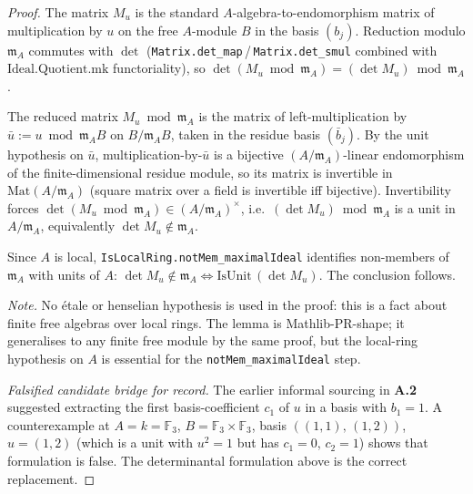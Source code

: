 \begin{proof}

\leanok
The matrix $M_u$ is the standard $A$-algebra-to-endomorphism
matrix of multiplication by $u$ on the free $A$-module $B$ in the
basis $(b_j)$. Reduction modulo $\mathfrak m_A$ commutes with
$\det$ (\texttt{Matrix.det\_map}\,/\,\texttt{Matrix.det\_smul}
combined with $\mathrm{Ideal.Quotient.mk}$ functoriality), so
$\det(M_u \bmod \mathfrak m_A) = (\det M_u) \bmod \mathfrak m_A$.

The reduced matrix $M_u \bmod \mathfrak m_A$ is the matrix of
left-multiplication by $\bar u := u \bmod \mathfrak m_A B$ on
$B / \mathfrak m_A B$, taken in the residue basis $(\bar b_j)$.
By the unit hypothesis on $\bar u$, multiplication-by-$\bar u$ is
a bijective $(A/\mathfrak m_A)$-linear endomorphism of the
finite-dimensional residue module, so its matrix is invertible
in $\mathrm{Mat}(A/\mathfrak m_A)$ (square matrix over a field is
invertible iff bijective). Invertibility forces
$\det(M_u \bmod \mathfrak m_A) \in (A/\mathfrak m_A)^\times$,
i.e.\ $(\det M_u) \bmod \mathfrak m_A$ is a unit in
$A/\mathfrak m_A$, equivalently $\det M_u \notin \mathfrak m_A$.

Since $A$ is local, \texttt{IsLocalRing.notMem\_maximalIdeal}
identifies non-members of $\mathfrak m_A$ with units of $A$:
$\det M_u \notin \mathfrak m_A \Leftrightarrow
\mathrm{IsUnit}\,(\det M_u)$. The conclusion follows.

\textit{Note.} No étale or henselian hypothesis is used in the
proof: this is a fact about finite free algebras over local rings.
The lemma is Mathlib-PR-shape; it generalises to any finite free
module by the same proof, but the local-ring hypothesis on $A$ is
essential for the \texttt{notMem\_maximalIdeal} step.

\textit{Falsified candidate bridge for record.} The earlier
informal sourcing in \textbf{A.2} suggested extracting the first
basis-coefficient $c_1$ of $u$ in a basis with $b_1 = 1$. A
counterexample at $A = k = \mathbb{F}_3$, $B = \mathbb{F}_3 \times
\mathbb{F}_3$, basis $((1,1),\,(1,2))$, $u = (1, 2)$ (which is a
unit with $u^2 = 1$ but has $c_1 = 0$, $c_2 = 1$) shows that
formulation is false. The determinantal formulation above is the
correct replacement.
\end{proof}

